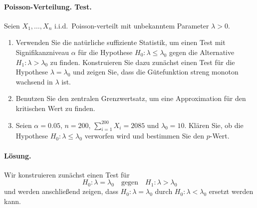 \paragraph{Poisson-Verteilung. Test.}
Seien $X_1,\ldots,X_n$ i.i.d.\ Poisson-verteilt mit unbekanntem Parameter $\lambda>0$.
\begin{enumerate}
    \item Verwenden Sie die natürliche suffiziente Statistik, um einen Test mit
        Signifikanzniveau $\alpha$ für die Hypothese $H_0:
        \lambda\leq\lambda_0$ gegen die Alternative $H_1: \lambda>\lambda_0$ zu
        finden. Konstruieren Sie dazu zunächst einen Test für die Hypothese
        $\lambda=\lambda_0$ und zeigen Sie, dass die Gütefunktion streng
        monoton wachsend in $\lambda$ ist. 
     \item Benutzen Sie den zentralen Grenzwertsatz, um eine Approximation für
         den kritischen Wert zu finden.
     \item Seien $\alpha=0.05$, $n=200$, $\sum_{i=1}^{200} X_i= 2085$ und
         $\lambda_0=10$. Klären Sie, ob die Hypothese $H_0:
         \lambda\leq\lambda_0$ verworfen wird und bestimmen Sie den $p$-Wert.
\end{enumerate}

\paragraph*{Lösung.}
Wir konstruieren zunächst einen Test für 
\begin{equation*}
    H_0 : \lambda=\lambda_0 \quad \textrm{gegen} \quad H_1 : \lambda>\lambda_0
\end{equation*}
und werden anschließend zeigen, dass $H_0: \lambda=\lambda_0$ durch
$H_0: \lambda<\lambda_0$ ersetzt werden kann.

